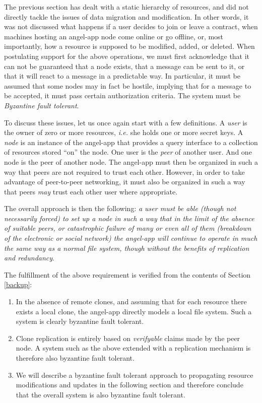 \documentclass[11pt]{article}
\begin{document}
\begin{mainmatter}
The previous section has dealt with a static hierarchy of resources, and did not directly tackle the issues of data migration and modification. In other words, it was not discussed what happens if a user decides to join or leave a contract, when machines hosting an angel-app node come online or go offline, or, most importantly, how a resource is supposed to be modified, added, or deleted. When postulating support for the above operations, we must first acknowledge that it can not be guaranteed that a node exists, that a message can be sent to it, or that it will react to a message in a predictable way. In particular, it must be assumed that some nodes may in fact be hostile, implying that for a message to be accepted, it must pass certain authorization criteria. The system must be \emph{Byzantine fault tolerant}.

To discuss these issues, let us once again start with a few definitions. A \emph{user} is the owner of zero or more resources, \emph{i.e.} she holds one or more secret keys. A \emph{node} is an instance of the angel-app that provides a query interface to a collection of resources stored ``on'' the node. One user is the \emph{peer} of another user. And one node is the peer of another node. The angel-app must then be organized in such a way that peers are not required to trust each other. However, in order to take advantage of peer-to-peer networking, it must also be organized in such a way that peers \emph{may} trust each other user where appropriate.

The overall approach is then the following: \emph{a user must be able (though not necessarily forced) to set up a node in such a way that in the limit of the absence of suitable peers, or catastrophic failure of many or even all of them (breakdown of the electronic or social network) the angel-app will continue to operate in much the same way as a normal file system, though without the benefits of replication and redundancy}.

The fulfillment of the above requirement is verified from the contents of Section \ref{backup}:
\begin{enumerate} 
\item In the absence of remote clones, and assuming that for each resource there exists a local clone, the angel-app directly models a local file system. Such a system is clearly byzantine fault tolerant.
\item Clone replication is entirely based on \emph{verifyable} claims made by the peer node. A system such as the above extended with a replication mechanism is therefore also byzantine fault tolerant.
\item We will describe a byzantine fault tolerant approach to propagating resource modifications and updates in the following section and therefore conclude that the overall system is also byzantine fault tolerant. 
\end{enumerate}


\end{mainmatter}
\end{document}

